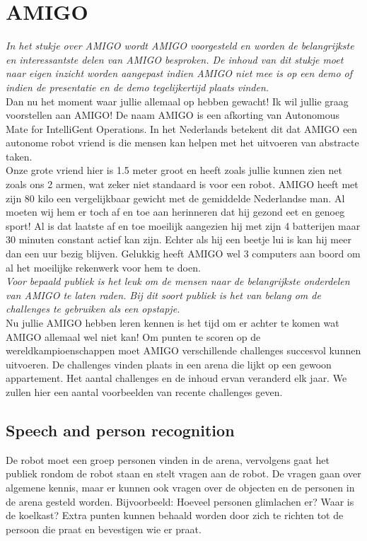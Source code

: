 \documentclass[a4paper,10pt]{article}
\numberwithin{equation}{section}
\numberwithin{figure}{section}
\numberwithin{table}{section}
\begin{document}
\section*{AMIGO}
\textit{In het stukje over AMIGO wordt AMIGO voorgesteld en worden de belangrijkste en interessantste delen van AMIGO besproken. De inhoud van dit stukje moet naar eigen inzicht worden aangepast indien AMIGO niet mee is op een demo of indien de presentatie en de demo tegelijkertijd plaats vinden.}\\


Dan nu het moment waar jullie allemaal op hebben gewacht! Ik wil jullie graag voorstellen aan AMIGO! De naam AMIGO is een afkorting van Autonomous Mate for IntelliGent Operations. In het Nederlands betekent dit dat AMIGO een autonome robot vriend is die mensen kan helpen met het uitvoeren van abstracte taken. \\

Onze grote vriend hier is 1.5 meter groot en heeft zoals jullie kunnen zien net zoals ons 2 armen, wat zeker niet standaard is voor een robot. AMIGO heeft met zijn 80 kilo een vergelijkbaar gewicht met de gemiddelde Nederlandse man. Al moeten wij hem er toch af en toe aan herinneren dat hij gezond eet en genoeg sport!
Al is dat laatste af en toe moeilijk aangezien hij met zijn 4 batterijen maar 30 minuten constant actief kan zijn. Echter als hij een beetje lui is kan hij meer dan een uur bezig blijven. Gelukkig heeft AMIGO wel 3 computers aan boord om al het moeilijke rekenwerk voor hem te doen.\\

\textit{Voor bepaald publiek is het leuk om de mensen naar de belangrijkste onderdelen van AMIGO te laten raden. Bij dit soort publiek is het van belang om de challenges te gebruiken als een opstapje.}\\

Nu jullie AMIGO hebben leren kennen is het tijd om er achter te komen wat AMIGO allemaal wel niet kan! Om punten te scoren op de wereldkampioenschappen moet AMIGO verschillende challenges succesvol kunnen uitvoeren. De challenges vinden plaats in een arena die lijkt op een gewoon appartement. Het aantal challenges en de inhoud ervan veranderd elk jaar. We zullen hier een aantal voorbeelden van recente challenges geven.

\subsection*{Speech and person recognition}
De robot moet een groep personen vinden in de arena, vervolgens gaat het publiek rondom de robot staan en stelt vragen aan de robot. De vragen gaan over algemene kennis, maar er kunnen ook vragen over de objecten en de personen in de arena gesteld worden. Bijvoorbeeld: Hoeveel personen glimlachen er? Waar is de koelkast? Extra punten kunnen behaald worden door zich te richten tot de persoon die praat en bevestigen wie er praat. 
\end{document}
